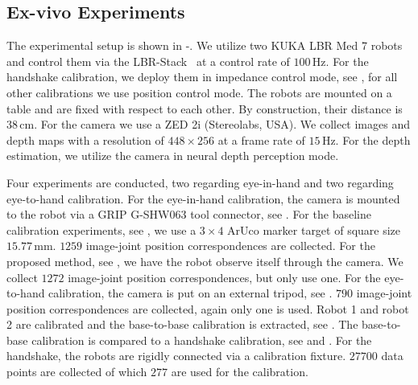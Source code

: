 \subsection{Ex-vivo Experiments}
The experimental setup is shown in -. We utilize two KUKA LBR Med 7 robots and control them via the LBR-Stack~\cite{huber2023lbr} at a control rate of $100\,\text{Hz}$. For the handshake calibration, we deploy them in impedance control mode, see , for all other calibrations we use position control mode. The robots are mounted on a table and are fixed with respect to each other. By construction, their distance is $38\,\text{cm}$. For the camera we use a ZED 2i (Stereolabs, USA). We collect images and depth maps with a resolution of $448 \times 256$ at a frame rate of $15\,\text{Hz}$. For the depth estimation, we utilize the camera in neural depth perception mode.

Four experiments are conducted, two regarding eye-in-hand and two regarding eye-to-hand calibration. For the eye-in-hand calibration, the camera is mounted to the robot via a GRIP G-SHW063 tool connector, see . For the baseline calibration experiments, see , we use a $3\times4$ ArUco marker target of square size $15.77\,\text{mm}$. $1259$ image-joint position correspondences are collected. For the proposed method, see , we have the robot observe itself through the camera. We collect $1272$ image-joint position correspondences, but only use one. For the eye-to-hand calibration, the camera is put on an external tripod, see . $790$ image-joint position correspondences are collected, again only one is used. Robot 1 and robot 2 are calibrated and the base-to-base calibration is extracted, see . The base-to-base calibration is compared to a handshake calibration, see  and . For the handshake, the robots are rigidly connected via a calibration fixture. $27700$ data points are collected of which $277$ are used for the calibration.

